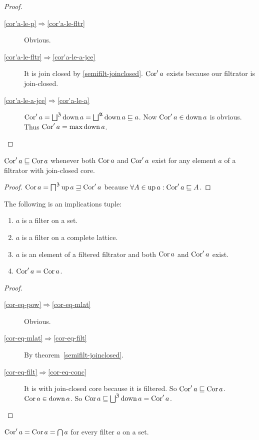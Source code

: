 \begin{proof}
~
\begin{description}
\item [{\ref{cor'a-le-p}$\Rightarrow$\ref{cor'a-le-fltr}}] Obvious.
\item [{\ref{cor'a-le-fltr}$\Rightarrow$\ref{cor'a-le-a-jce}}] It is
join closed by \ref{semifilt-joinclosed}. $\operatorname{Cor}'a$ exists because
our filtrator is join-closed.
\item [{\ref{cor'a-le-a-jce}$\Rightarrow$\ref{cor'a-le-a}}] $\operatorname{Cor}'a=\bigsqcup^{\mathfrak{Z}}\operatorname{down} a=\bigsqcup^{\mathfrak{A}}\operatorname{down} a\sqsubseteq a$.
Now $\operatorname{Cor}'a\in\operatorname{down} a$ is obvious. Thus $\operatorname{Cor}'a=\max\operatorname{down} a$.
\end{description}
\end{proof}
\begin{prop}
$\operatorname{Cor}'a\sqsubseteq\operatorname{Cor} a$ whenever both $\operatorname{Cor} a$ and $\operatorname{Cor}'a$ exist
for any element $a$ of a filtrator with join-closed core.\end{prop}
\begin{proof}
$\operatorname{Cor} a=\bigsqcap^{\mathfrak{Z}}\operatorname{up} a\sqsupseteq\operatorname{Cor}'a$ because $\forall A\in\operatorname{up} a:\operatorname{Cor}'a\sqsubseteq A$.\end{proof}
\begin{thm}
\label{cor-eq}The following is an implications tuple:
\begin{enumerate}
\item \label{cor-eq-pow}$a$ is a filter on a set.
\item \label{cor-eq-mlat}$a$ is a filter on a complete lattice.
\item \label{cor-eq-filt}$a$ is an element of a filtered filtrator and
both $\operatorname{Cor} a$ and $\operatorname{Cor}'a$ exist.
\item \label{cor-eq-conc}$\operatorname{Cor}'a=\operatorname{Cor} a$.
\end{enumerate}
\end{thm}
\begin{proof}
~
\begin{description}
\item [{\ref{cor-eq-pow}$\Rightarrow$\ref{cor-eq-mlat}}] Obvious.
\item [{\ref{cor-eq-mlat}$\Rightarrow$\ref{cor-eq-filt}}] By theorem~\ref{semifilt-joinclosed}.
\item [{\ref{cor-eq-filt}$\Rightarrow$\ref{cor-eq-conc}}] It is with
join-closed core because it is filtered. So $\operatorname{Cor}'a\sqsubseteq\operatorname{Cor} a$.
$\operatorname{Cor} a\in\operatorname{down} a$. So $\operatorname{Cor} a\sqsubseteq\bigsqcup^{\mathfrak{Z}}\operatorname{down} a=\operatorname{Cor}'a$.
\end{description}
\end{proof}
\begin{cor}
\label{dcor-eq-cor}$\operatorname{Cor}'a=\operatorname{Cor} a=\bigcap a$ for every filter $a$
on a set.
\end{cor}

